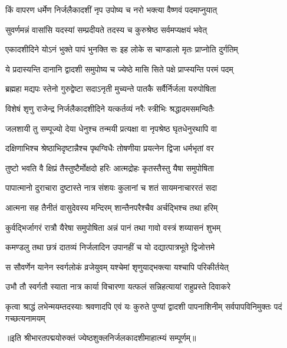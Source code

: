 \twolineshloka
{किं वापरण धर्मेण निर्जलैकादशीं नृप}
{उपोष्य च नरो भक्त्या वैष्णवं पदमाप्नुयात्} %

\twolineshloka
{सुवर्णमन्नं वासांसि यदस्यां सम्प्रदीयते}
{तदस्य च कुरुश्रेष्ठ सर्वमप्यक्षयं भवेत्} %

\twolineshloka
{एकादशीदिने योऽनं भुक्ते पापं भुनक्ति सः}
{इह लोके स चाण्डालो मृतः प्राप्नोति दुर्गतिम्} %

\twolineshloka
{ये प्रदास्यन्ति दानानि द्वादशी समुपोष्य च}
{ज्येष्ठे मासि सिते पक्षे प्राप्स्यन्ति परमं पदम्} %

\twolineshloka
{ब्रह्महा मद्यपः स्तेनो गुरुद्वेष्टा सदाऽनृती}
{मुच्यन्ते पातकै सर्वैर्निर्जला यरुपोषिता} %

\twolineshloka
{विशेषं शृणु राजेन्द्र निर्जलैकादशीदिने}
{यत्कर्तव्यं नरैः स्त्रीभिः श्रद्धादमसमन्वितैः} %

\twolineshloka
{जलशायी तु सम्पूज्यो देया धेनुश्च तन्मयी}
{प्रत्यक्षा वा नृपश्रेष्ठ घृतधेनुरथापि वा} %

\twolineshloka
{दक्षिणाभिश्च श्रेष्ठाभिदृष्टान्नैश्च पृथग्विधैः}
{तोषणीया प्रयत्नेन द्विजा धर्मभृतां वर} %

\twolineshloka
{तुष्टो भवति वै क्षिप्रं तैस्तुष्टैर्मोक्षदो हरिः}
{आत्मद्रोहः कृतस्तैस्तु यैषा समुपोषिता} %

\twolineshloka
{पापात्मानो दुराचारा दुष्टास्ते नात्र संशयः}
{कुलानां च शतं सायमनाचाररतं सदा} %

\twolineshloka
{आत्मना सह तैनीतं वासुदेवस्य मन्दिरम्}
{शान्तैनपरैश्चैव अर्चद्भिश्च तथा हरिम्} %

\twolineshloka
{कुर्वद्भिर्जागरं रात्रौ यैरेषा समुपोषिता}
{अन्नं पानं तथा गावो वस्त्रं शय्यासनं शुभम्} %

\twolineshloka
{कमण्डलु तथा छत्रं दातव्यं निर्जलादिन}
{उपानहीं च यो दद्यात्पात्रभूते द्विजोत्तमे} %

\twolineshloka
{स सौवर्णेन यानेन स्वर्गलोकं व्रजेयुवम्}
{यश्चेमां शृणुयाद्भक्त्या यश्चापि परिकीर्तयेत्} %

\twolineshloka
{उभौ तौ स्वर्गतौ स्याता नात्र कार्या विचारणा}
{यत्फलं सन्निहत्यायां राहुप्रस्ते दिवाकरे} %


\threelineshloka
{कृत्वा श्राद्धं लभेन्मयम्तदस्याः श्रवणादपि}
{एवं यः कुरुते पुण्यां द्वादशी पापनाशिनीम्}
{सर्वपापविनिमुक्तः पदं गच्छत्यनामयम्} %

॥इति श्रीभारतपद्मयोरुक्तं ज्येष्ठशुक्लनिर्जलकादशीमाहात्म्यं सम्पूर्णम्॥


